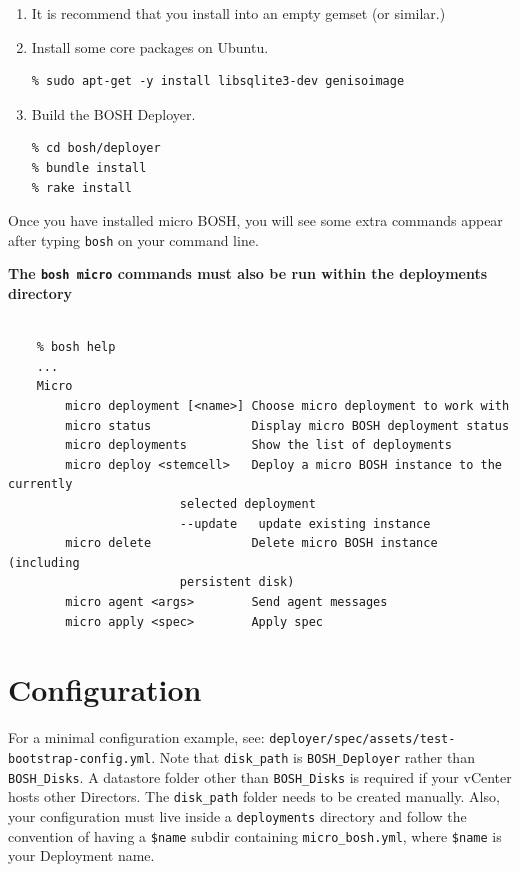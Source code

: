 \begin{enumerate}
\item It is recommend that you install into an empty gemset (or similar.)

\item Install some core packages on Ubuntu.

\begin{verbatim}
% sudo apt-get -y install libsqlite3-dev genisoimage
\end{verbatim}


\item Build the BOSH Deployer.

\begin{verbatim}
% cd bosh/deployer
% bundle install
% rake install
\end{verbatim}


\end{enumerate}

Once you have installed micro BOSH, you will see some extra commands appear after typing \texttt{bosh} on your command line. 

\textbf{The \texttt{bosh micro} commands must also be run within the deployments directory}

\begin{adjustwidth}{2.5em}{2.5em}
\begin{verbatim}

    % bosh help
    ...
    Micro
        micro deployment [<name>] Choose micro deployment to work with
        micro status              Display micro BOSH deployment status
        micro deployments         Show the list of deployments
        micro deploy <stemcell>   Deploy a micro BOSH instance to the currently
                        selected deployment
                        --update   update existing instance
        micro delete              Delete micro BOSH instance (including
                        persistent disk)
        micro agent <args>        Send agent messages
        micro apply <spec>        Apply spec

\end{verbatim}
\end{adjustwidth}

\section{Configuration}
\label{configuration}

For a minimal configuration example, see: \texttt{deployer\slash spec\slash assets\slash test-bootstrap-config.yml}. Note that \texttt{disk\_path} is \texttt{BOSH\_Deployer} rather than \texttt{BOSH\_Disks}. A datastore folder other than \texttt{BOSH\_Disks} is required if your vCenter hosts other Directors. The \texttt{disk\_path} folder needs to be created manually. Also, your configuration must live inside a \texttt{deployments} directory and follow the convention of having a \texttt{\$name} subdir containing \texttt{micro\_bosh.yml}, where \texttt{\$name} is your Deployment name. 

